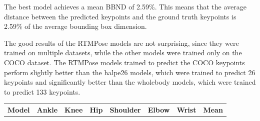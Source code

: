 The best model achieves a mean BBND of 2.59\%. This means that the average distance between the predicted keypoints and the ground truth keypoints is 2.59\% of the average bounding box dimension.

The good results of the RTMPose models are not surprising, since they were trained on multiple datasets, while the other models were trained only on the COCO dataset. The RTMPose models trained to predict the COCO keypoints perform slightly better than the halpe26 models, which were trained to predict 26 keypoints and significantly better than the wholebody models, which were trained to predict 133 keypoints.

\begin{table}[htbp]
    \setlength{\tabcolsep}{4pt}

    \begin{tabular}{l ccccccc}
        \toprule
        \textbf{Model}                   & \textbf{Ankle} & \textbf{Knee} & \textbf{Hip}  & \textbf{Shoulder} & \textbf{Elbow} & \textbf{Wrist} & \textbf{Mean} \\


\end{tabular}
\end{table}
